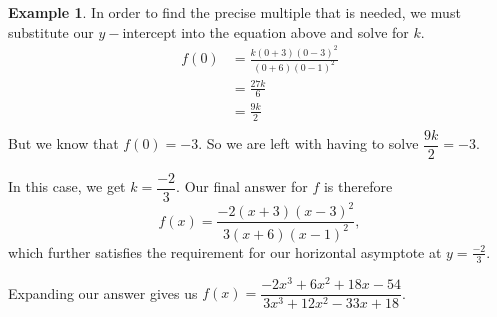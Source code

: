 \documentclass[12pt]{book}
\theoremstyle{definition}
\newtheorem{example}{Example}
\begin{document}
\begin{example}
In order to find the precise multiple that is needed, we must substitute our $y-$intercept into the equation above and solve for $k$. 
\begin{equation*}
	\begin{split}
f(0)	& = \frac{k(0+3)(0-3)^2}{(0+6)(0-1)^2}\\
	& = \frac{27k}{6}\\
	& = \frac{9k}{2}\\
	\end{split}
\end{equation*}
But we know that $f(0)=-3$.  So we are left with having to solve $\dfrac{9k}{2}=-3$.
\par
In this case, we get $k=\dfrac{-2}{3}$.  Our final answer for $f$ is therefore
$$f(x)=\frac{-2(x+3)(x-3)^2}{3(x+6)(x-1)^2},$$
which further satisfies the requirement for our horizontal asymptote at $y=\frac{-2}{3}$.
\par
Expanding our answer gives us $f(x)=\dfrac{-2x^3+6x^2+18x-54}{3x^3+12x^2-33x+18}$.
\end{example}
\newpage
\end{document}
